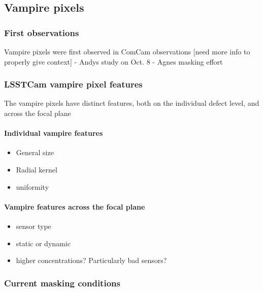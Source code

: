 \subsection{Vampire pixels}\label{vampire-pixels}

\subsubsection{First observations}\label{first-observations}

Vampire pixels were first observed in ComCam observations {[}need more
info to properly give context{]} - Andy\textquotesingle s study on Oct.
8 - Agnes masking effort

\subsubsection{LSSTCam vampire pixel
features}\label{lsstcam-vampire-pixel-features}

The vampire pixels have distinct features, both on the individual defect
level, and across the focal plane

\paragraph{Individual vampire
features}\label{individual-vampire-features}

\begin{itemize}
\tightlist
\item
  General size
\item
  Radial kernel
\item
  uniformity
\end{itemize}

\paragraph{Vampire features across the focal
plane}\label{vampire-features-across-the-focal-plane}

\begin{itemize}
\tightlist
\item
  sensor type
\item
  static or dynamic
\item
  higher concentrations? Particularly bad sensors?
\end{itemize}

\subsubsection{Current masking
conditions}\label{current-masking-conditions}

